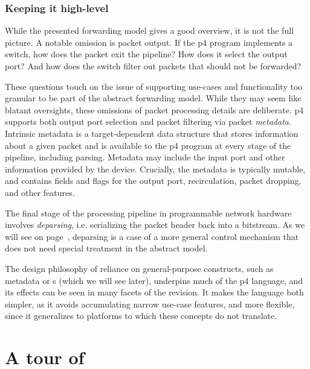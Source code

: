 \subsubsection*{Keeping it high-level}

While the presented forwarding model gives a good overview, it is not the full
picture. A notable omission is packet output. If the \acrshort{p4} program
implements a switch, how does the packet exit the pipeline? How does it select
the output port? And how does the switch filter out packets that should not be
forwarded?

These questions touch on the issue of supporting use-cases and functionality too
granular to be part of the abstract forwarding model. While they may seem like
blatant oversights, these omissions of packet processing details are deliberate.
\acrshort{p4} supports both output port selection and packet filtering via
packet \emph{metadata}. Intrinsic metadata is a target-dependent data structure
that stores information about a given packet and is available to the
\acrshort{p4} program at every stage of the pipeline, including parsing.
Metadata may include the input port and other information provided by the
device. Crucially, the metadata is typically mutable, and contains fields and
flags for the output port, recirculation, packet dropping, and other features.

The final stage of the processing pipeline in programmable network hardware
involves \emph{deparsing}, i.e. serializing the packet header back into a
bitstream. As we will see on page~\pageref{sec:p4-deparsing}, deparsing is a
case of a more general control mechanism that does not need special treatment
in the abstract model.

The design philosophy of reliance on general-purpose constructs, such as
metadata or \extern{}s (which we will see later), underpins much of the
\acrshort{p4} language, and its effects can be seen in many facets of the \pfs
revision. It makes the language both simpler, as it avoids accumulating narrow
use-case features, and more flexible, since it generalizes to platforms to which
these concepts do not translate.

\section{A tour of \pfs}

